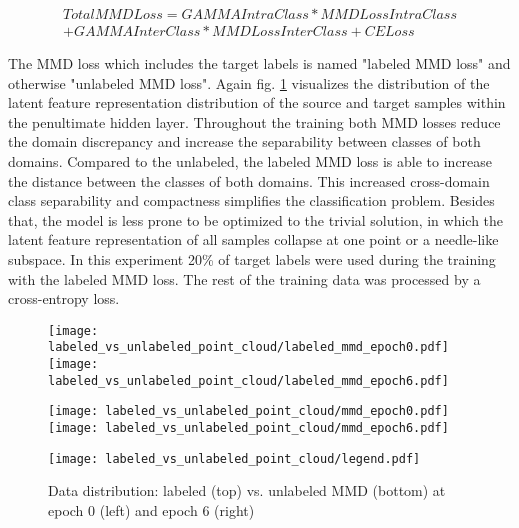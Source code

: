 \begin{equation}
\begin{split}
    TotalMMDLoss = GAMMAIntraClass * MMDLossIntraClass\\ + GAMMAInterClass * MMDLossInterClass + CELoss
\end{split}
\end{equation}

 The MMD loss which includes the target labels is named "labeled MMD loss" and otherwise "unlabeled MMD loss". Again fig. \ref{fig:point_cloud_labeled_unlabeled_mmd} visualizes the distribution of the latent feature representation distribution of the source and target samples within the penultimate hidden layer. Throughout the training both MMD losses reduce the domain discrepancy and increase the separability between classes of both domains. Compared to the unlabeled, the labeled MMD loss is able to increase the distance between the classes of both domains. This increased cross-domain class separability and compactness simplifies the classification problem. Besides that, the model is less prone to be optimized to the trivial solution, in which the latent feature representation of all samples collapse at one point or a needle-like subspace. In this experiment 20\% of target labels were used during the training with the labeled MMD loss. The rest of the training data was processed by a cross-entropy loss.

\begin{figure}[H]
  \centering
  \texttt{[image: labeled\_vs\_unlabeled\_point\_cloud/labeled\_mmd\_epoch0.pdf]}
  \hspace{.3cm}
  \texttt{[image: labeled\_vs\_unlabeled\_point\_cloud/labeled\_mmd\_epoch6.pdf]}

  \vspace{.1cm}

  \texttt{[image: labeled\_vs\_unlabeled\_point\_cloud/mmd\_epoch0.pdf]}
  \hspace{.1cm}
  \texttt{[image: labeled\_vs\_unlabeled\_point\_cloud/mmd\_epoch6.pdf]}

  \vspace{.1cm}
  
  \texttt{[image: labeled\_vs\_unlabeled\_point\_cloud/legend.pdf]}

  \caption{Data distribution: labeled (top) vs. unlabeled MMD (bottom) at epoch 0 (left) and epoch 6 (right)}
  \label{fig:point_cloud_labeled_unlabeled_mmd}
\end{figure}

